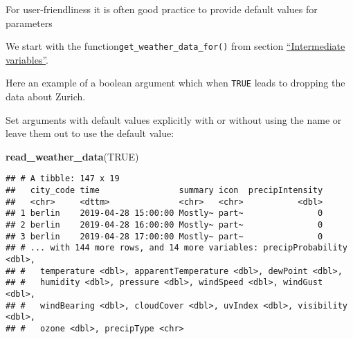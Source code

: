 \documentclass[]{book}
\newenvironment{Shaded}{\begin{snugshade}}{\end{snugshade}}
\newcommand{\CommentTok}[1]{\textcolor[rgb]{0.56,0.35,0.01}{\textit{#1}}}
\newcommand{\ControlFlowTok}[1]{\textcolor[rgb]{0.13,0.29,0.53}{\textbf{#1}}}
\newcommand{\DataTypeTok}[1]{\textcolor[rgb]{0.13,0.29,0.53}{#1}}
\newcommand{\KeywordTok}[1]{\textcolor[rgb]{0.13,0.29,0.53}{\textbf{#1}}}
\newcommand{\NormalTok}[1]{#1}
\newcommand{\OperatorTok}[1]{\textcolor[rgb]{0.81,0.36,0.00}{\textbf{#1}}}
\newcommand{\OtherTok}[1]{\textcolor[rgb]{0.56,0.35,0.01}{#1}}
\newcommand{\StringTok}[1]{\textcolor[rgb]{0.31,0.60,0.02}{#1}}
\begin{document}
For user-friendliness it is often good practice to provide default values for parameters

We start with the function\texttt{get\_weather\_data\_for()} from section \protect\hyperlink{intermediate}{``Intermediate variables''}.

Here an example of a boolean argument which when \texttt{TRUE} leads to dropping the data about Zurich.

\begin{Shaded}
\end{Shaded}

Set arguments with default values explicitly with or without using the name or leave them out to use the default value:

\begin{Shaded}
\begin{Highlighting}[]
\KeywordTok{read_weather_data}\NormalTok{(}\OtherTok{TRUE}\NormalTok{)}
\end{Highlighting}
\end{Shaded}

\begin{verbatim}
## # A tibble: 147 x 19
##   city_code time                summary icon  precipIntensity
##   <chr>     <dttm>              <chr>   <chr>           <dbl>
## 1 berlin    2019-04-28 15:00:00 Mostly~ part~               0
## 2 berlin    2019-04-28 16:00:00 Mostly~ part~               0
## 3 berlin    2019-04-28 17:00:00 Mostly~ part~               0
## # ... with 144 more rows, and 14 more variables: precipProbability <dbl>,
## #   temperature <dbl>, apparentTemperature <dbl>, dewPoint <dbl>,
## #   humidity <dbl>, pressure <dbl>, windSpeed <dbl>, windGust <dbl>,
## #   windBearing <dbl>, cloudCover <dbl>, uvIndex <dbl>, visibility <dbl>,
## #   ozone <dbl>, precipType <chr>
\end{verbatim}
\end{document}
